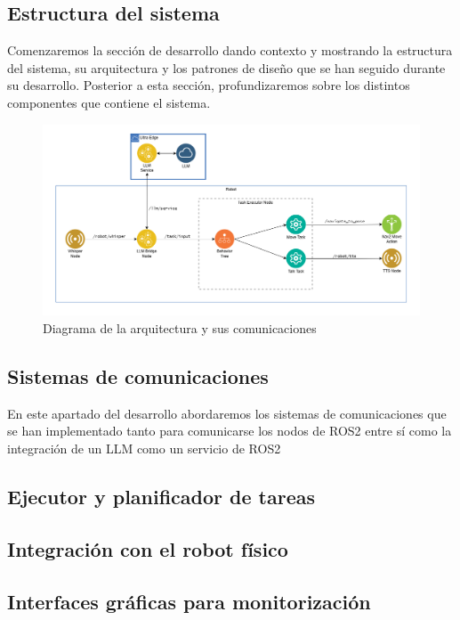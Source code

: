 \documentclass[../main.tex]{subfiles}
\begin{document}
\subsection{Estructura del sistema}
Comenzaremos la sección de desarrollo dando contexto y mostrando la estructura del sistema, su arquitectura y los patrones de diseño que se han seguido durante su desarrollo. Posterior a esta
sección, profundizaremos sobre los distintos componentes que contiene el sistema.

\begin{figure}[H]
\centering
\includegraphics[width=\textwidth]{images/architecture.png}
\caption{Diagrama de la arquitectura y sus comunicaciones}\label{fig:architecture_diagram}
\end{figure}

\subsection{Sistemas de comunicaciones}
En este apartado del desarrollo abordaremos los sistemas de comunicaciones que se han implementado tanto para comunicarse los nodos de ROS2 entre sí como la integración
de un LLM como un servicio de ROS2

\blindtext

\subsection{Ejecutor y planificador de tareas}
\blindtext

\subsection{Integración con el robot físico}
\blindtext

\subsection{Interfaces gráficas para monitorización}
\blindtext
\end{document}
